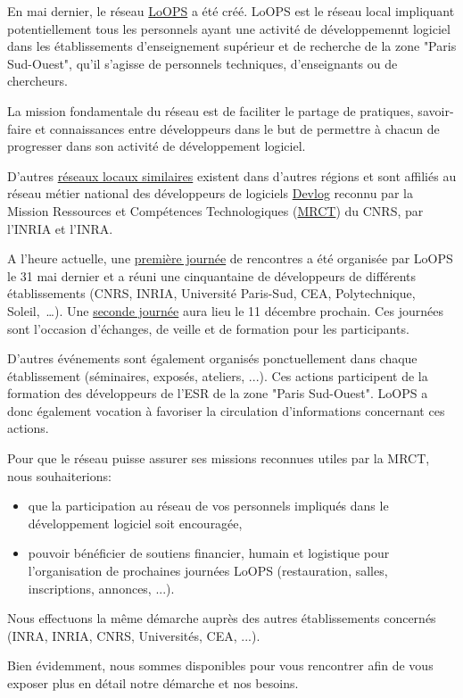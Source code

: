 En mai dernier, le réseau \href{http://reseau-loops.github.com/}{LoOPS}
a été créé. LoOPS est le réseau local
impliquant potentiellement tous les personnels ayant une activité de
développemennt logiciel dans les établissements d'enseignement supérieur
et de recherche de la zone "Paris Sud-Ouest", qu'il s'agisse de personnels
techniques, d'enseignants ou de chercheurs.

La mission fondamentale du réseau est de faciliter le partage de pratiques,
savoir-faire et connaissances entre développeurs dans le but de permettre à
chacun de progresser dans son activité de développement logiciel.

D'autres \href{http://devlog.cnrs.fr/region}{réseaux locaux similaires} existent dans d'autres régions
et sont affiliés au réseau métier national des développeurs de logiciels
\href{http://devlog.cnrs.fr}{Devlog} reconnu par la Mission Ressources et Compétences Technologiques
(\href{http://www.mrct.cnrs.fr/}{MRCT}) du CNRS, par l'INRIA et l'INRA.

A l'heure actuelle, une
\href{http://reseau-loops.github.com/journee\_2012\_05\_31.html}{première journée}
de rencontres a été organisée par
LoOPS le 31 mai dernier et a réuni une cinquantaine de développeurs de
différents établissements (CNRS, INRIA, Université Paris-Sud, CEA,
Polytechnique, Soleil,~\dots).
Une \href{http://reseau-loops.github.com/journee\_2012\_12.html}{seconde journée} aura lieu le 11 décembre
prochain. Ces journées sont l'occasion d'échanges, de veille et de
formation pour les participants.

D'autres événements sont également organisés ponctuellement dans chaque
établissement (séminaires, exposés, ateliers, ...). Ces actions participent
de la formation des développeurs de l'ESR de la zone "Paris Sud-Ouest". LoOPS
a donc également vocation à favoriser la circulation d'informations concernant
ces actions.

Pour que le réseau puisse assurer ses missions reconnues utiles par la MRCT,
nous souhaiterions:
\begin{itemize}
\item que la participation au réseau de vos personnels impliqués dans le
  développement logiciel soit encouragée,
\item pouvoir bénéficier de soutiens financier, humain et logistique pour
  l'organisation de prochaines journées LoOPS (restauration, salles,
  inscriptions, annonces, ...).
\end{itemize}

Nous effectuons la même démarche auprès des autres établissements concernés
(INRA, INRIA, CNRS, Universités, CEA, ...).

Bien évidemment, nous sommes disponibles pour vous rencontrer afin de vous
exposer plus en détail notre démarche et nos besoins.